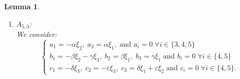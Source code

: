 \documentclass[10pt]{article}
\newtheorem{Lemma}{Lemma}
\begin{document}
\begin{Lemma}
\begin{enumerate}
\begin{equation}(\mathscr{L}_\xi\nabla) (v_4,v_4)=-\varepsilon b_4 v_5.\label{(v_4,v_4)}\end{equation}
\begin{equation}(\mathscr{L}_\xi\nabla) (v_4,v_5)=\tfrac{1}{2}\Big(\varepsilon a_2 v_4 + \varepsilon b_2 v_5\Big).\end{equation}
\begin{equation}(\mathscr{L}_\xi\nabla) (v_5,v_5)=0.\label{(v_5,v_5)}
\end{equation}


  \item \(A_{5,3}\):\\
  
  We consider:
\[\begin{cases} 
a_1=-\alpha\xi_2,\; a_2=\alpha\xi_1,\; 
\text{and $a_i=0$}\; \forall i\in \{3,4,5\}\\ 
b_1=- \beta\xi_2-\gamma\xi_3 ,\; 
b_2= \beta\xi_1, \; b_3=\gamma\xi_1\; \text{and $b_i=0$} \;\forall i\in \{4,5\}\\ 
c_1=-\delta\xi_3,\; 
c_2= -\varepsilon\xi_3, \; c_3=\delta\xi_1 + \varepsilon\xi_2\; \text{and $c_i=0$} \;\forall i\in \{4,5\}.
\end{cases}\]


\end{enumerate}
\end{Lemma}
\end{document}
